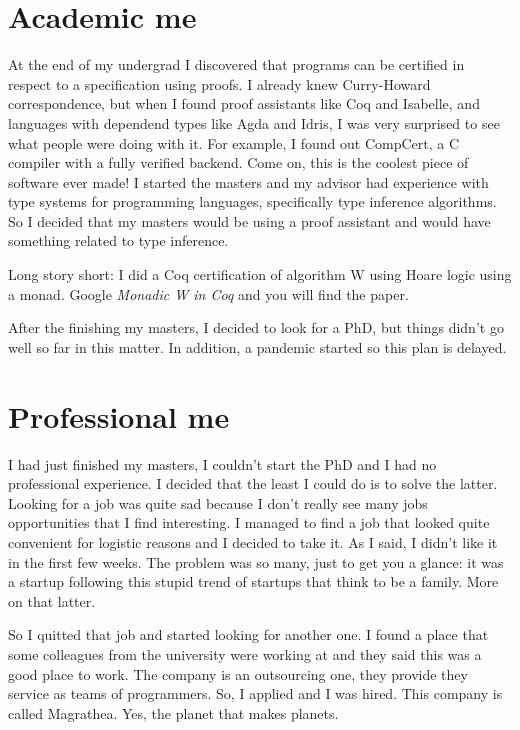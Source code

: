 \documentclass[11pt,a4paper,sans]{moderncv}
\begin{document}
\medskip

\section{Academic me}
At the end of my undergrad I discovered that programs can be certified in respect to a specification using proofs.
I already knew Curry-Howard correspondence, but when I found proof assistants like Coq and Isabelle, and languages with dependend types like Agda and Idris, I was very surprised to see what people were doing with it.
For example, I found out CompCert, a C compiler with a fully verified backend.
Come on, this is the coolest piece of software ever made!
I started the masters and my advisor had experience with type systems for programming languages, specifically type inference algorithms.
So I decided that my masters would be using a proof assistant and would have something related to type inference.

\medskip

Long story short: I did a Coq certification of algorithm W using Hoare logic using a monad.
Google \textit{Monadic W in Coq} and you will find the paper.

\medskip

After the finishing my masters, I decided to look for a PhD, but things didn't go well so far in this matter.
In addition, a pandemic started so this plan is delayed.

\section{Professional me}
I had just finished my masters, I couldn't start the PhD and I had no professional experience.
I decided that the least I could do is to solve the latter.
Looking for a job was quite sad because I don't really see many jobs opportunities that I find interesting.
I managed to find a job that looked quite convenient for logistic reasons and I decided to take it.
As I said, I didn't like it in the first few weeks.
The problem was so many, just to get you a glance: it was a startup following this stupid trend of startups that think to be a family.
More on that latter.

\medskip

So I quitted that job and started looking for another one.
I found a place that some colleagues from the university were working at and they said this was a good place to work.
The company is an outsourcing one, they provide they service as teams of programmers.
So, I applied and I was hired.
This company is called Magrathea.
Yes, the planet that makes planets.
\end{document}
